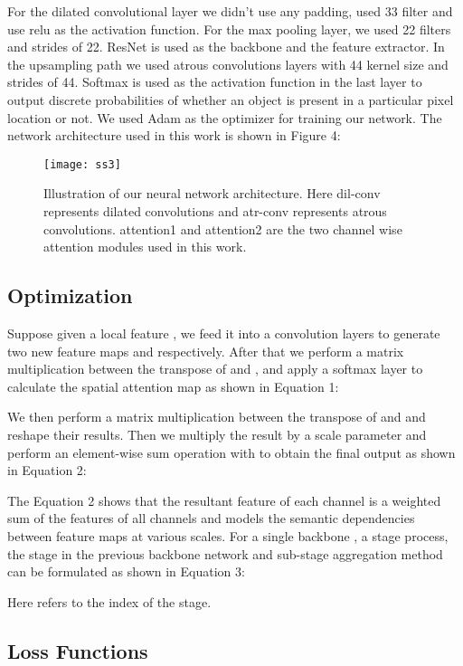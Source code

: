 \documentclass{article}
\begin{document}
For the dilated convolutional layer we didn’t use any padding, used 33 filter and use relu as the activation function. For the max pooling layer, we used 22 filters and strides of 22. ResNet is used as the backbone and the feature extractor. In the upsampling path we used atrous convolutions layers with 44 kernel size and strides of 44. Softmax is used as the activation function in the last layer to output discrete probabilities of whether an object is present in a particular pixel location or not. We used Adam as the optimizer for training our network. The network architecture used in this work is shown in Figure 4:

\begin{figure}[htp]
    \centering
    \texttt{[image: ss3]}
    \caption{Illustration of our neural network architecture. Here dil-conv represents dilated convolutions and atr-conv represents atrous convolutions. attention1 and attention2 are the two channel wise attention modules used in this work.}
    \label{fig3}
\end{figure}

\subsection{Optimization}

Suppose given a local feature , we feed it into a convolution layers to generate two new feature maps  and  respectively. After that we perform a matrix multiplication between the transpose of  and , and apply a softmax layer to calculate the spatial attention map as shown in Equation 1:



We then perform a matrix multiplication
between the transpose of  and  and reshape their results. Then we multiply the result by a scale parameter  and perform an element-wise sum operation with
 to obtain the final output as shown in Equation 2:



The Equation 2 shows that the resultant feature of each channel is a weighted sum of the features of all channels and models the semantic dependencies between feature maps at various scales. For a single backbone , a stage process, the stage in the previous backbone network and sub-stage aggregation method can be formulated as shown in Equation 3: 



Here  refers to the index of the stage. 

\subsection{Loss Functions}
\end{document}
